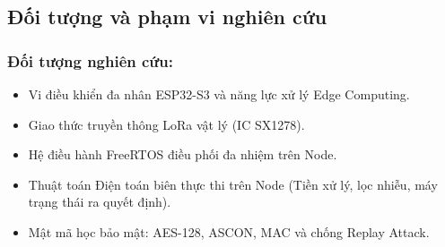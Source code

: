 \subsection{Đối tượng và phạm vi nghiên cứu}
\subsubsection{Đối tượng nghiên cứu:}
\begin{itemize}
    \item Vi điều khiển đa nhân ESP32-S3 và năng lực xử lý Edge Computing.
    \item Giao thức truyền thông LoRa vật lý (IC SX1278).
    \item Hệ điều hành FreeRTOS điều phối đa nhiệm trên Node.
    \item Thuật toán Điện toán biên thực thi trên Node (Tiền xử lý, lọc nhiễu, máy trạng thái ra quyết định).
    \item Mật mã học bảo mật: AES-128, ASCON, MAC và chống Replay Attack.
\end{itemize}
